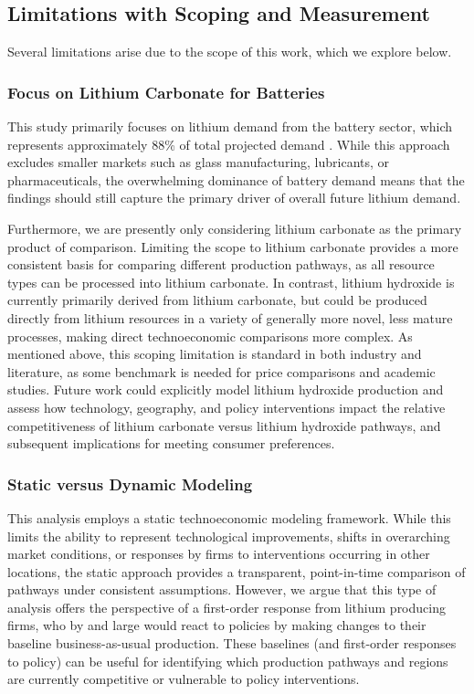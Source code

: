 \documentclass{article}
\renewcommand\_{\textunderscore\allowbreak}
\begin{document}
\clearpage
\subsection{Limitations with Scoping and Measurement} \label{app:04-limitations}

Several limitations arise due to the scope of this work, which we explore below. 

\subsubsection{Focus on Lithium Carbonate for Batteries} \label{app:04-limitations-carbonate}

This study primarily focuses on lithium demand from the battery sector, which represents approximately 88\% of total projected demand \cite{usgeologicalsurveyMineralCommoditySummaries2026}. While this approach excludes smaller markets such as glass manufacturing, lubricants, or pharmaceuticals, the overwhelming dominance of battery demand means that the findings should still capture the primary driver of overall future lithium demand.

Furthermore, we are presently only considering lithium carbonate as the primary product of comparison. Limiting the scope to lithium carbonate provides a more consistent basis for comparing different production pathways, as all resource types can be processed into lithium carbonate. In contrast, lithium hydroxide is currently primarily derived from lithium carbonate, but could be produced directly from lithium resources in a variety of generally more novel, less mature processes, making direct technoeconomic comparisons more complex. As mentioned above, this scoping limitation is standard in both industry and literature, as some benchmark is needed for price comparisons and academic studies. Future work could explicitly model lithium hydroxide production and assess how technology, geography, and policy interventions impact the relative competitiveness of lithium carbonate versus lithium hydroxide pathways, and subsequent implications for meeting consumer preferences.

\subsubsection{Static versus Dynamic Modeling}\label{app:04-limitations-static}

This analysis employs a static technoeconomic modeling framework. While this limits the ability to represent technological improvements, shifts in overarching market conditions, or responses by firms to interventions occurring in other locations, the static approach provides a transparent, point-in-time comparison of pathways under consistent assumptions. However, we argue that this type of analysis offers the perspective of a first-order response from lithium producing firms, who by and large would react to policies by making changes to their baseline business-as-usual production. These baselines (and first-order responses to policy) can be useful for identifying which production pathways and regions are currently competitive or vulnerable to policy interventions.
\end{document}
